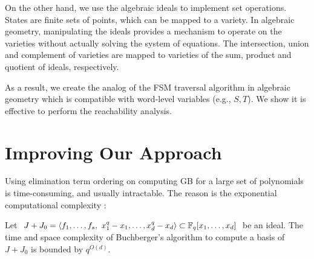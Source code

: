 \begin{figure}[bp]
\end{figure}

On the other hand, we use the algebraic ideals to implement set operations. States are finite sets of points,
which can be mapped to a variety.
In algebraic geometry, manipulating the ideals provides a mechanism to 
operate on the varieties without actually solving the system of equations. The intersection, union and 
complement of varieties are mapped to varieties of the sum, product and quotient of ideals, respectively.

As a result, we create the analog of the FSM traversal algorithm in algebraic geometry which is 
compatible with word-level variables (e.g., $S,T$). We show it is effective to perform the 
reachability analysis.

\section{Improving Our Approach}
\label{sec:improve}

Using elimination term ordering on computing GB for a large set of polynomials is time-consuming, and usually 
intractable. The reason is the exponential computational complexity \cite{gao:gf-gb-ms}:
\begin{Theorem}
Let $J+J_0 = \langle f_1, \dots, f_s, ~x_1^q - x_1, \dots, x_d^q -
x_d\rangle \subset {\mathbb{F}}_{q} [x_1, \dots, x_d]$ be an ideal. The time and
space complexity of Buchberger's algorithm to compute a \Grobner
basis of $J+J_0$ is bounded by $q^{O(d)}$.
\end{Theorem}

